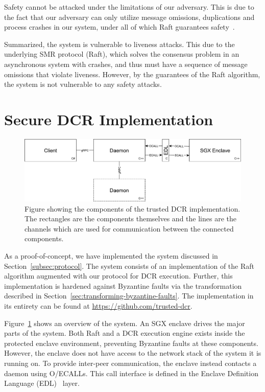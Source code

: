 \documentclass{article}
\begin{document}
		Safety cannot be attacked under the limitations of our adversary.
        This is due to the fact that our adversary can only utilize message omissions, duplications and process crashes in our system, under all of which Raft guarantees safety~\cite{ongaro_search_2014}.

        Summarized, the system is vulnerable to liveness attacks.
        This due to the underlying SMR protocol (Raft), which solves the consensus problem in an asynchronous system with crashes, and thus must have a sequence of message omissions that violate liveness.
        However, by the guarantees of the Raft algorithm, the system is not vulnerable to any safety attacks.

	\section{Secure DCR Implementation}

	\begin{figure}[t]
		\centering
		\includegraphics[width=\textwidth]{figures/dcr-graphs/network-stack.pdf}
		\caption{Figure showing the components of the trusted DCR implementation.
		The rectangles are the components themselves and the lines are the channels which are used for communication between the connected components. }
		\label{fig:network-stack}
	\end{figure}

	As a proof-of-concept, we have implemented the system discussed in Section~\ref{subsec:protocol}.
	The system consists of an implementation of the Raft~\cite{ongaro_search_2014} algorithm augmented with our protocol for DCR execution.
	Further, this implementation is hardened against Byzantine faults via the transformation described in Section~\ref{sec:transforming-byzantine-faults}.
	The implementation in its entirety can be found at \url{https://github.com/trusted-dcr}.

	Figure~\ref{fig:network-stack} shows an overview of the system.
	An SGX enclave drives the major parts of the system.
	Both Raft and a DCR execution engine exists inside the protected enclave environment, preventing Byzantine faults at these components.
	However, the enclave does not have access to the network stack of the system it is running on.
	To provide inter-peer communication, the enclave instead contacts a daemon using O/ECALLs.
	This call interface is defined in the Enclave Definition Language (EDL)~\cite{intel_sgx_guide} layer.
\end{document}
